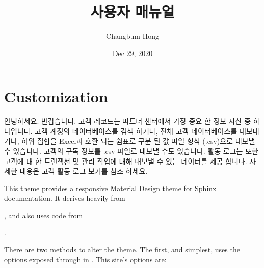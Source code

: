 \documentclass[letterpaper,10pt,english]{sphinxmanual}
\title{사용자 매뉴얼}
\date{Dec 29, 2020}
\author{Changbum Hong}
\let\sphinxpxdimen\pdfpxdimen\else\newdimen\sphinxpxdimen
\begin{document}
\pagestyle{empty}
\sphinxmaketitle
\pagestyle{plain}
\sphinxtableofcontents
\pagestyle{normal}
\label{\detokenize{index::doc}}



\chapter{Customization}
\label{\detokenize{customization:customization}}\label{\detokenize{customization:id1}}\label{\detokenize{customization::doc}}
\noindent\sphinxincludegraphics[width=1320\sphinxpxdimen,height=825\sphinxpxdimen]{{screenshot}.png}

안녕하세요. 반갑습니다. 고객 레코드는 파트너 센터에서 가장 중요 한 정보 자산 중 하나입니다. 고객 계정의 데이터베이스를 검색 하거나, 전체 고객 데이터베이스를 내보내거나, 하위 집합을 Excel과 호환 되는 쉼표로 구분 된 값 파일 형식 (.csv)으로 내보낼 수 있습니다. 고객의 구독 정보를 .csv 파일로 내보낼 수도 있습니다.
활동 로그는 또한 고객에 대 한 트랜잭션 및 관리 작업에 대해 내보낼 수 있는 데이터를 제공 합니다. 자세한 내용은 고객 활동 로그 보기를 참조 하세요.

This theme provides a responsive Material Design theme for Sphinx
documentation. It derives heavily from
%
\begin{footnote}[1]\sphinxAtStartFootnote
{}
%
\end{footnote},
and also uses code from
%
\begin{footnote}[2]\sphinxAtStartFootnote
{}
%
\end{footnote}.

There are two methods to alter the theme.  The first, and simplest, uses the
options exposed through  in . This site’s
options are:
\end{document}
